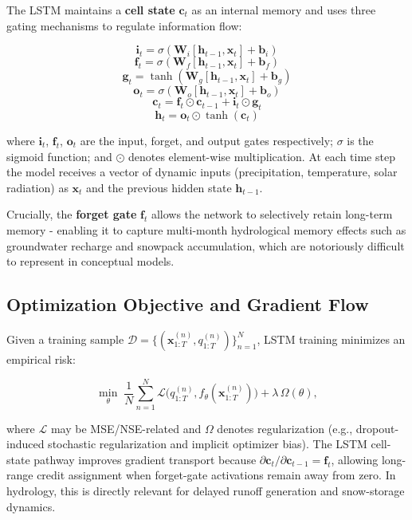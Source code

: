 \documentclass[
]{krantz}
\begin{document}
The LSTM \citep{hochreiter1997} maintains a \textbf{cell state} \(\mathbf{c}_t\) as an internal
memory and uses three gating mechanisms to regulate information flow:

\[\mathbf{i}_t = \sigma(\mathbf{W}_i [\mathbf{h}_{t-1}, \mathbf{x}_t] + \mathbf{b}_i)\]
\[\mathbf{f}_t = \sigma(\mathbf{W}_f [\mathbf{h}_{t-1}, \mathbf{x}_t] + \mathbf{b}_f)\]
\[\mathbf{g}_t = \tanh(\mathbf{W}_g [\mathbf{h}_{t-1}, \mathbf{x}_t] + \mathbf{b}_g)\]
\[\mathbf{o}_t = \sigma(\mathbf{W}_o [\mathbf{h}_{t-1}, \mathbf{x}_t] + \mathbf{b}_o)\]
\[\mathbf{c}_t = \mathbf{f}_t \odot \mathbf{c}_{t-1} + \mathbf{i}_t \odot \mathbf{g}_t\]
\[\mathbf{h}_t = \mathbf{o}_t \odot \tanh(\mathbf{c}_t)\]

where \(\mathbf{i}_t\), \(\mathbf{f}_t\), \(\mathbf{o}_t\) are the input, forget, and output
gates respectively; \(\sigma\) is the sigmoid function; and \(\odot\) denotes element-wise
multiplication. At each time step the model receives a vector of dynamic inputs
(precipitation, temperature, solar radiation) as \(\mathbf{x}_t\) and the previous
hidden state \(\mathbf{h}_{t-1}\).

Crucially, the \textbf{forget gate} \(\mathbf{f}_t\) allows the network to selectively retain
long-term memory - enabling it to capture multi-month hydrological memory effects such
as groundwater recharge and snowpack accumulation, which are notoriously difficult to
represent in conceptual models.

\subsection{Optimization Objective and Gradient Flow}\label{optimization-objective-and-gradient-flow}

Given a training sample \(\mathcal{D}=\{(\mathbf{x}^{(n)}_{1:T}, q^{(n)}_{1:T})\}_{n=1}^N\),
LSTM training minimizes an empirical risk:

\[
\min_\theta \; \frac{1}{N}\sum_{n=1}^N \mathcal{L}\big(q^{(n)}_{1:T}, f_\theta(\mathbf{x}^{(n)}_{1:T})\big) + \lambda\,\Omega(\theta),
\]

where \(\mathcal{L}\) may be MSE/NSE-related and \(\Omega\) denotes regularization
(e.g., dropout-induced stochastic regularization and implicit optimizer bias). The LSTM
cell-state pathway improves gradient transport because
\(\partial \mathbf{c}_t / \partial \mathbf{c}_{t-1} = \mathbf{f}_t\), allowing long-range
credit assignment when forget-gate activations remain away from zero. In hydrology,
this is directly relevant for delayed runoff generation and snow-storage dynamics.
\end{document}

